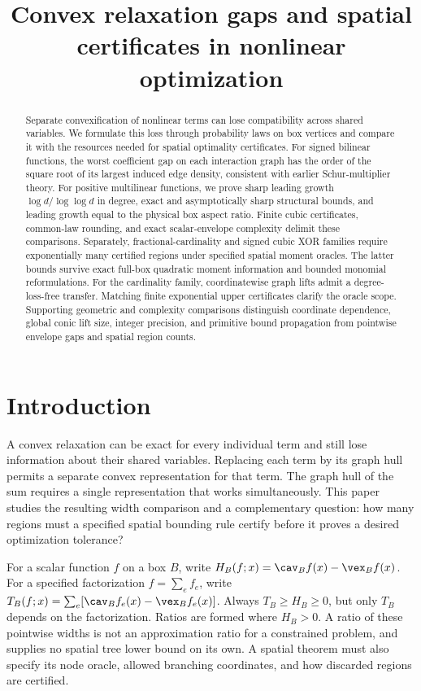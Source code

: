 \documentclass[11pt]{article}
\title{Convex relaxation gaps and spatial certificates in nonlinear optimization}
\author{}
\date{}
\begin{document}
\maketitle
\begin{abstract}
Separate convexification of nonlinear terms can lose compatibility across
shared variables. We formulate this loss through probability laws on box
vertices and compare it with the resources needed for spatial optimality
certificates. For signed bilinear functions, the worst coefficient gap on
each interaction graph has the order of the square root of its largest
induced edge density, consistent with earlier Schur-multiplier theory.
For positive multilinear functions, we prove sharp leading growth
$\log d/\log\log d$ in degree, exact and asymptotically sharp structural
bounds, and leading growth equal to the physical box aspect ratio.
Finite cubic certificates, common-law rounding, and exact scalar-envelope
complexity delimit these comparisons. Separately, fractional-cardinality
and signed cubic XOR families require exponentially many certified regions
under specified spatial moment oracles. The latter bounds survive exact
full-box quadratic moment information and bounded monomial reformulations.
For the cardinality family, coordinatewise graph lifts admit a
degree-loss-free transfer. Matching
finite exponential upper certificates clarify the oracle scope. Supporting
geometric and complexity comparisons distinguish coordinate dependence,
global conic lift size, integer precision, and primitive bound propagation
from pointwise envelope gaps and spatial region counts.
\end{abstract}
\setcounter{tocdepth}{1}
\tableofcontents
\clearpage
\section{Introduction}\label{sec:introduction}
A convex relaxation can be exact for every individual term and still lose
information about their shared variables. Replacing each term by its graph
hull permits a separate convex representation for that term. The graph
hull of the sum requires a single representation that works simultaneously.
This paper studies the resulting width comparison and a complementary
question: how many regions must a specified spatial bounding rule certify
before it proves a desired optimization tolerance?

For a scalar function $f$ on a box $B$, write
$H_B(f;x)=\cav_B f(x)-\vex_B f(x)$. For a specified factorization
$f=\sum_e f_e$, write
$T_B(f;x)=\sum_e[\cav_B f_e(x)-\vex_B f_e(x)]$.
Always $T_B\ge H_B\ge0$, but only $T_B$ depends on the factorization.
Ratios are formed where $H_B>0$. A ratio of these pointwise widths is not
an approximation ratio for a constrained problem, and supplies no spatial
tree lower bound on its own. A spatial theorem must also specify its node
oracle, allowed branching coordinates, and how discarded regions are
certified.
\end{document}
